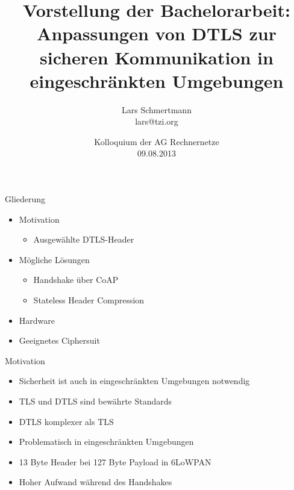 \documentclass{beamer}
\title[Anpassungen von DTLS]%
{%
  Vorstellung der Bachelorarbeit: Anpassungen von DTLS zur sicheren Kommunikation in eingeschränkten Umgebungen
}
\author[Lars Schmertmann]%
{
{Lars Schmertmann}\\
\vspace{.2cm}
{\scriptsize lars@tzi.org}
}
\institute{TZI, Universit\"{a}t Bremen, Deutschland}
\date[08.2013]%
{{Kolloquium der AG Rechnernetze\\
09.08.2013}}%
\begin{document}

\begin{frame}
  \titlepage
\end{frame}

\begin{frame}{Gliederung}
  \begin{itemize}
    \item Motivation
    \begin{itemize}
     \item Ausgewählte DTLS-Header
    \end{itemize}
    \item Mögliche Lösungen
    \begin{itemize}
      \item Handshake über CoAP
      \item Stateless Header Compression
    \end{itemize}
    \item Hardware
    \item Geeignetes Ciphersuit
  \end{itemize}

\end{frame}

\begin{frame}{Motivation}
  \begin{itemize}
    \item Sicherheit ist auch in eingeschränkten Umgebungen notwendig
    \item TLS und DTLS sind bewährte Standards
    \item DTLS komplexer als TLS
    \item Problematisch in eingeschränkten Umgebungen
    \item 13 Byte Header bei 127 Byte Payload in 6LoWPAN
    \item Hoher Aufwand während des Handshakes
  \end{itemize}
\end{frame}
\end{document}
